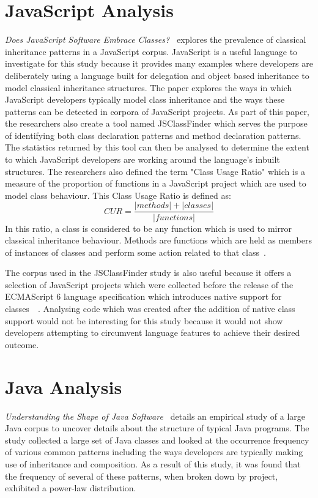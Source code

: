 \section{JavaScript Analysis}
\textit{Does JavaScript Software Embrace Classes?~\cite{JSClassFinder}} explores the prevalence of classical inheritance patterns in a JavaScript corpus. JavaScript is a useful language to investigate for this study because it provides many examples where developers are deliberately using a language built for delegation and object based inheritance to model classical inheritance structures. The paper explores the ways in which JavaScript developers typically model class inheritance and the ways these patterns can be detected in corpora of JavaScript projects. As part of this paper, the researchers also create a tool named JSClassFinder which serves the purpose of identifying both class declaration patterns and method declaration patterns. The statistics returned by this tool can then be analysed to determine the extent to which JavaScript developers are working around the language's inbuilt structures. The researchers also defined the term "Class Usage Ratio" which is a measure of the proportion of functions in a JavaScript project which are used to model class behaviour. This Class Usage Ratio is defined as:
\[CUR = \frac{\left\vert methods \right\vert + \left\vert classes \right\vert}{\left\vert functions \right\vert}\]
In this ratio, a class is considered to be any function which is used to mirror classical inheritance behaviour. Methods are functions which are held as members of instances of classes and perform some action related to that class~\cite{JSClassFinder}.

The corpus used in the JSClassFinder study is also useful because it offers a selection of JavaScript projects which were collected before the release of the ECMAScript 6 language specification which introduces native support for classes~\cite{ES6Spec}~\cite{JSClassFinder}. Analysing code which was created after the addition of native class support would not be interesting for this study because it would not show developers attempting to circumvent language features to achieve their desired outcome.

\section{Java Analysis}
\textit{Understanding the Shape of Java Software~\cite{ShapeOfJava}} details an empirical study of a large Java corpus to uncover details about the structure of typical Java programs. The study collected a large set of Java classes and looked at the occurrence frequency of various common patterns including the ways developers are typically making use of inheritance and composition. As a result of this study, it was found that the frequency of several of these patterns, when broken down by project, exhibited a power-law distribution.
\newline

